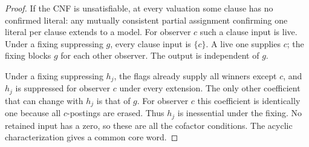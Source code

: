 \begin{proof}
If the CNF is unsatisfiable, at every valuation some clause has no
confirmed literal: any mutually consistent partial assignment
confirming one literal per clause extends to a model. For observer
$c$ such a clause input is live. Under a fixing suppressing $g$,
every clause input is $\{c\}$. A live one supplies $c$; the fixing
blocks $g$ for each other observer. The output is independent of $g$.

Under a fixing suppressing $h_j$, the flags already supply all
winners except $c$, and $h_j$ is suppressed for observer $c$ under
every extension. The only other coefficient that can change with
$h_j$ is that of $g$. For observer $c$ this coefficient is identically one
because all $c$-postings are erased. Thus $h_j$ is
inessential under the fixing. No retained input has a zero, so these
are all the cofactor conditions. The acyclic characterization gives
a common core word.
\end{proof}

